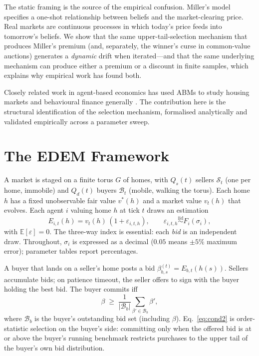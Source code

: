 \documentclass{article}
\begin{document}
The static framing is the source of the empirical confusion.
Miller's model specifies a one-shot relationship between beliefs
and the market-clearing price. Real markets are continuous
processes in which today's price feeds into tomorrow's beliefs.
We show that the same upper-tail-selection mechanism that produces
Miller's premium (and, separately, the winner's curse
\citep{thaler1988winners} in common-value auctions) generates a
\emph{dynamic} drift when iterated---and that the same underlying
mechanism can produce either a premium or a discount in finite
samples, which explains why empirical work has found both.

Closely related work in agent-based economics has used ABMs to
study housing markets \citep{baptista2016boe,geanakoplos2012leverage}
and behavioural finance generally \citep{shiller2003}. The
contribution here is the structural identification of the
selection mechanism, formalised analytically and validated
empirically across a parameter sweep.

\section{The EDEM Framework}
\label{sec:framework}

A market is staged on a finite torus $G$ of homes, with $Q_s(t)$
sellers $\mathcal{S}_t$ (one per home, immobile) and $Q_d(t)$ buyers
$\mathcal{B}_t$ (mobile, walking the torus). Each home $h$ has a fixed
unobservable fair value $v^{*}(h)$ and a market value $v_t(h)$ that
evolves. Each agent $i$ valuing home $h$ at tick $t$ draws an
estimation
\begin{equation}
\label{eq:estimation}
E_{i,t}(h) = v_{t}(h)\,(1+\varepsilon_{i,t,h}),
\qquad
\varepsilon_{i,t,h} \stackrel{\mathrm{iid}}{\sim} F_{i}(\sigma_{i}),
\end{equation}
with $\mathbb{E}[\varepsilon] = 0$. The three-way index is essential:
each \emph{bid} is an independent draw. Throughout, $\sigma_i$ is
expressed as a decimal ($0.05$ means $\pm 5\%$ maximum error);
parameter tables report percentages.

A buyer that lands on a seller's home posts a bid
$\beta_{b,s}^{(t)} = E_{b,t}(h(s))$. Sellers accumulate bids; on
patience timeout, the seller offers to sign with the buyer holding
the best bid. The buyer commits iff
\begin{equation}
\label{eq:cond2}
\beta \;\ge\; \frac{1}{|\mathcal{B}_b|}\sum_{\beta'\in\mathcal{B}_b}\beta',
\end{equation}
where $\mathcal{B}_b$ is the buyer's outstanding bid set (including
$\beta$). Eq.~\eqref{eq:cond2} is order-statistic selection on the
buyer's side: committing only when the offered bid is at or above
the buyer's running benchmark restricts purchases to the upper tail
of the buyer's own bid distribution.
\end{document}
